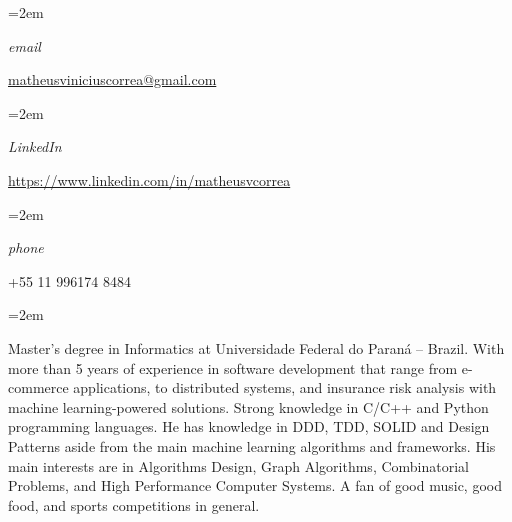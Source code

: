 \documentclass[fontsize=11pt,paper=a4]{scrartcl}
\date{} %
\newcommand{\ProfileInfo}[2]{\noindent\hangindent=2em\hangafter=0
  \parbox{5em}{\small \textit{#1}\hspace{1em}} {\small #2}}
\newcommand{\Description}[1]{\hangindent=2em\hangafter=0%
  \noindent\raggedright\footnotesize{#1}\par\flushleft\normalsize}
\begin{document}
\pagestyle{scrheadings}


\begin{cv}{%
    \noindent%
  } %
  
  
  \vspace{.5em}
  
  \ProfileInfo{email}{\href{mailto:matheusviniciuscorrea@gmail.com}{matheusviniciuscorrea@gmail.com}}

  \ProfileInfo{LinkedIn}{\href{https://www.linkedin.com/in/matheusvcorrea}{https://www.linkedin.com/in/matheusvcorrea}}

  \ProfileInfo{phone}{+55 11 996174 8484}
  
  \vspace{1em}

  \noindent{}\vspace{.5em}
  
  \Description{%
    Master's degree in Informatics at Universidade Federal do Paraná --
    Brazil. With more than 5 years of experience in software development that
    range from e-commerce applications, to distributed systems, and insurance
    risk analysis with machine learning-powered solutions. Strong knowledge in
    C/C++ and Python programming languages. He has knowledge in DDD, TDD, SOLID
    and Design Patterns aside from the main machine learning algorithms and
    frameworks. His main interests are in Algorithms Design, Graph Algorithms,
    Combinatorial Problems, and High Performance Computer Systems. A fan of good
    music, good food, and sports competitions in general.%
  }


\end{cv}
\end{document}
